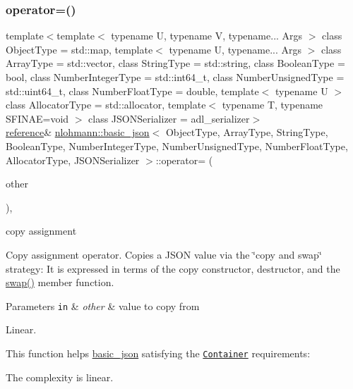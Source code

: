 \subsubsection{\texorpdfstring{operator=()}{operator=()}}
{\footnotesize\ttfamily template$<$template$<$ typename U, typename V, typename... Args $>$ class Object\+Type = std\+::map, template$<$ typename U, typename... Args $>$ class Array\+Type = std\+::vector, class String\+Type  = std\+::string, class Boolean\+Type  = bool, class Number\+Integer\+Type  = std\+::int64\+\_\+t, class Number\+Unsigned\+Type  = std\+::uint64\+\_\+t, class Number\+Float\+Type  = double, template$<$ typename U $>$ class Allocator\+Type = std\+::allocator, template$<$ typename T, typename S\+F\+I\+N\+A\+E=void $>$ class J\+S\+O\+N\+Serializer = adl\+\_\+serializer$>$ \\
\mbox{\hyperlink{classnlohmann_1_1basic__json_ac6a5eddd156c776ac75ff54cfe54a5bc}{reference}}\& \mbox{\hyperlink{classnlohmann_1_1basic__json}{nlohmann\+::basic\+\_\+json}}$<$ Object\+Type, Array\+Type, String\+Type, Boolean\+Type, Number\+Integer\+Type, Number\+Unsigned\+Type, Number\+Float\+Type, Allocator\+Type, J\+S\+O\+N\+Serializer $>$\+::operator= (\begin{DoxyParamCaption}\item[{\mbox{\hyperlink{classnlohmann_1_1basic__json}{basic\+\_\+json}}$<$ Object\+Type, Array\+Type, String\+Type, Boolean\+Type, Number\+Integer\+Type, Number\+Unsigned\+Type, Number\+Float\+Type, Allocator\+Type, J\+S\+O\+N\+Serializer $>$}]{other }\end{DoxyParamCaption})\hspace{0.3cm}{\ttfamily [inline]}, {\ttfamily [noexcept]}}



copy assignment 

Copy assignment operator. Copies a J\+S\+ON value via the \char`\"{}copy and swap\char`\"{} strategy\+: It is expressed in terms of the copy constructor, destructor, and the {\ttfamily \mbox{\hyperlink{classnlohmann_1_1basic__json_a8c9d932353e1ab98a7dc2fc27e002031}{swap()}}} member function.


\begin{DoxyParams}[1]{Parameters}
\mbox{\tt in}  & {\em other} & value to copy from\\
\hline
\end{DoxyParams}
Linear.

This function helps {\ttfamily \mbox{\hyperlink{classnlohmann_1_1basic__json}{basic\+\_\+json}}} satisfying the \href{http://en.cppreference.com/w/cpp/concept/Container}{\tt Container} requirements\+:
\begin{DoxyItemize}
\item The complexity is linear.
\end{DoxyItemize}

